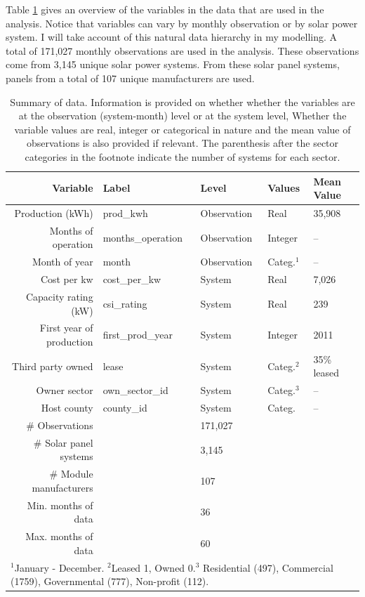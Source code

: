 \documentclass[a4paper]{article}
\begin{document}
Table \ref{tbl:variables} gives an overview of the variables in the data that are used in the analysis. Notice that variables can vary by monthly observation or by solar power system. I will take account of this natural data hierarchy in my modelling. A total of 171,027 monthly observations are used in the analysis. These observations come from 3,145 unique solar power systems. From these solar panel systems, panels from a total of 107 unique manufacturers are used.

\begin{table}
  \caption{Summary of data. Information is provided on whether whether the variables are at the observation (system-month) level or at the system level, Whether the variable values are real, integer or categorical in nature and the mean value of observations is also provided if relevant. The parenthesis after the sector categories in the footnote indicate the number of systems for each sector.}
  \begin{tabular}{rllll}
  \toprule
    Variable &  Label &   Level & Values &   Mean Value  \\
    \midrule
    Production (kWh) &  prod\_kwh &  Observation & Real & 35,908   \\
    Months of operation &  months\_operation &  Observation & Integer & --   \\
    Month of year & month & Observation & Categ.$^{1}$& -- \\
    Cost per kw & cost\_per\_kw & System & Real & 7,026 \\
    Capacity rating (kW) & csi\_rating & System & Real & 239 \\
    First year of production & first\_prod\_year & System & Integer & 2011 \\
    Third party owned & lease & System & Categ.$^{2}$  &  35\% leased \\
    Owner sector & own\_sector\_id & System & Categ.$^{3}$& -- \\
    Host county & county\_id & System & Categ. & -- \\
    \midrule
    \# Observations && 171,027 && \\
    \# Solar panel systems && 3,145 && \\
    \# Module manufacturers && 107 && \\
     Min. months of data && 36 && \\
     Max. months of data && 60 && \\
  \bottomrule
    \multicolumn{5}{l}{\scriptsize{$^{1}$January - December. $^{2}$Leased 1, Owned 0.$^{3}$ Residential (497), Commercial (1759), Governmental (777), Non-profit (112).}}
  \end{tabular}
  \label{tbl:variables}
\end{table}
\end{document}
